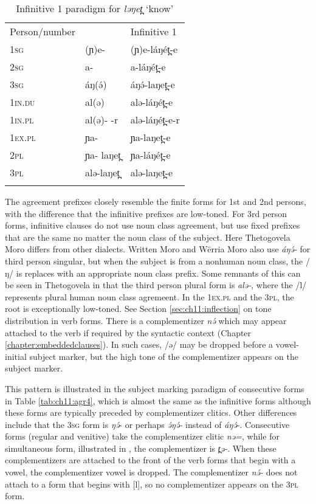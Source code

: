 \begin{table}
	\begin{tabular}[t]{lll}
	\lsptoprule
Person/number & 	  & 		Infinitive 1	\\ 
1\textsc{sg}		& 	(ɲ)e- 	& (ɲ)e-láŋét̪-e  		  \\
2\textsc{sg} 	&		a- 	& a-láŋét̪-e \\
3\textsc{sg}		& 	áŋ(ə́) 	& 	áŋə́-laŋet̪-e \\
1\textsc{in}.\textsc{du}	& 	al(ə)  	& 	alə-láŋét̪-e \\
1\textsc{in}.\textsc{pl}		&  al(ə)- -r & 	alə-láŋét̪-e-r\\
1\textsc{ex}.\textsc{pl}		& 	ɲa-  & 		ɲa-laŋet̪-e\\
2\textsc{pl}	& 	ɲa- laŋet̪ & 	ɲa-láŋét̪-e\\
3\textsc{pl} 	& 		alə-laŋet̪	& alə-laŋet̪-e\\
	\lspbottomrule
	\end{tabular}
	\caption{Infinitive 1 paradigm for \textit{ləŋet̪} `know'}
	\label{tab:ch11:agr3}
\end{table}

The agreement prefixes closely resemble the finite forms for 1st and 2nd persons, with the difference that the infinitive prefixes are low-toned. For 3rd person forms, infinitive clauses do not use noun class agreement, but use fixed prefixes that are the same no matter the noun class of the subject. Here Thetogovela Moro differs from other dialects. Written Moro and Wërria Moro also use \textit{áŋə́-} for third person singular, but when the subject is from a nonhuman noun class, the /ŋ/ is replaces with an appropriate noun class prefix. Some remnants of this can be seen in Thetogovela in that the third person plural form is \textit{alə-}, where the /l/ represents plural human noun class agremeent. In the 1\textsc{ex}.\textsc{pl} and the 3\textsc{pl}, the root is exceptionally low-toned. See Section \ref{sec:ch11:inflection} on tone distribution in verb forms. There is a complementizer \textit{nə́ } which may appear attached to the verb if required by the syntactic context (Chapter \ref{chapter:embeddedclauses}). In such cases, /ə/ may be dropped before a vowel-initial subject marker, but the high tone of the complementizer appears on the subject marker.

This pattern is illustrated in the subject marking paradigm of consecutive forms in Table \ref{tab:ch11:agr4}, which is almost the same as the infinitive forms although these forms are typically preceded by complementizer clitics. Other differences include that the 3\textsc{sg} form is \textit{ŋə́}- or perhaps \textit{ə́ŋə́-} instead of \textit{áŋə́}-. Consecutive forms (regular and venitive) take the complementizer clitic \textit{nə=}, while for simultaneous form, illustrated in , the complementizer is \textit{t̪ə-}. When these complementizers are attached to the front of the verb forms that begin with a vowel, the complementizer vowel is dropped. The complementizer \textit{nə́-} does not attach to a form that begins with [l], so no complementizer appears on the 3\textsc{pl} form. %

